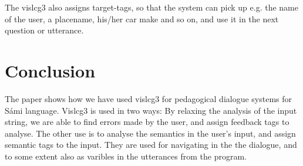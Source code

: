 \documentclass[11pt]{article}
\begin{document}
The vislcg3 also assigns target-tags, so that the system can pick up e.g. the name of the user, a placename, his/her car make and so on, and use it in the next question or utterance.
 
\section{Conclusion}
The paper shows how we have used vislcg3 for pedagogical dialogue systems for Sámi language. Vislcg3 is used in two ways: By relaxing the analysis of the input string, we are able to find errors made by the user, and assign feedback tags to analyse. The other use is to analyse the semantics in the user's input, and assign semantic tags to the input. They are used for navigating in the the dialogue, and to some extent also as varibles in the utterances from the program.  




%
%
%
%
%




%
%



	
\end{document}
